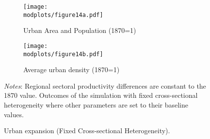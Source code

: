 \documentclass[./20250130-paper.tex]{subfiles}
\begin{document}

\begin{figure}[p!]
	\begin{adjustbox}{center}	
		\begin{subfigure}{\ptwo\textwidth}
			\texttt{[image: \\modplots/figure14a.pdf]}
			\caption{Urban Area and Population (1870=1)\label{fig:model-citysize-fixedcross}}
		\end{subfigure}
		\hspace{0.1cm}
		\begin{subfigure}{\ptwo\textwidth}
			\texttt{[image: \\modplots/figure14b.pdf]}
			\caption{Average urban density (1870=1)\label{fig:model-density-fixedcross}}
		\end{subfigure}	
	\end{adjustbox}	
	\caption{Urban expansion (Fixed Cross-sectional Heterogeneity).\label{fig:model-urbanexp-fixedcross}}
	{\footnotesize \textit{Notes}: Regional sectoral productivity differences  are constant to the 1870 value. Outcomes of the simulation with fixed cross-sectional heterogeneity where other parameters are set to their baseline values.}
\end{figure}
\end{document}

